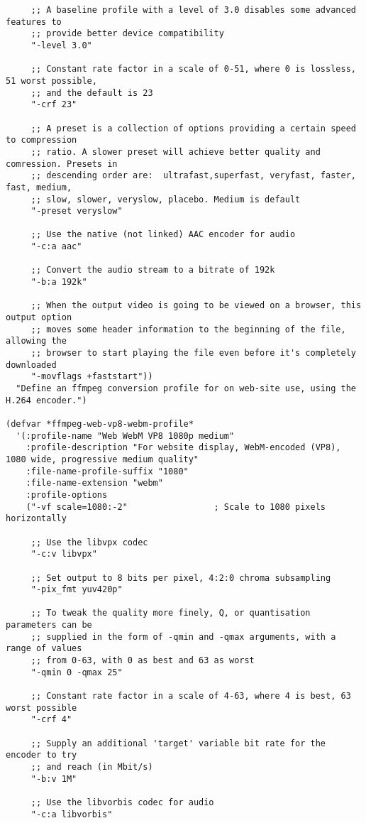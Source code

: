 \documentclass{article}
\begin{document}
\begin{verbatim}
     ;; A baseline profile with a level of 3.0 disables some advanced features to
     ;; provide better device compatibility
     "-level 3.0"

     ;; Constant rate factor in a scale of 0-51, where 0 is lossless, 51 worst possible,
     ;; and the default is 23
     "-crf 23"

     ;; A preset is a collection of options providing a certain speed to compression
     ;; ratio. A slower preset will achieve better quality and comression. Presets in
     ;; descending order are:  ultrafast,superfast, veryfast, faster, fast, medium,
     ;; slow, slower, veryslow, placebo. Medium is default
     "-preset veryslow"

     ;; Use the native (not linked) AAC encoder for audio
     "-c:a aac"

     ;; Convert the audio stream to a bitrate of 192k
     "-b:a 192k"

     ;; When the output video is going to be viewed on a browser, this output option
     ;; moves some header information to the beginning of the file, allowing the
     ;; browser to start playing the file even before it's completely downloaded
     "-movflags +faststart"))
  "Define an ffmpeg conversion profile for on web-site use, using the H.264 encoder.")

(defvar *ffmpeg-web-vp8-webm-profile*
  '(:profile-name "Web WebM VP8 1080p medium"
    :profile-description "For website display, WebM-encoded (VP8), 1080 wide, progressive medium quality"
    :file-name-profile-suffix "1080"
    :file-name-extension "webm"
    :profile-options
    ("-vf scale=1080:-2"                 ; Scale to 1080 pixels horizontally

     ;; Use the libvpx codec
     "-c:v libvpx"
     
     ;; Set output to 8 bits per pixel, 4:2:0 chroma subsampling
     "-pix_fmt yuv420p"                  

     ;; To tweak the quality more finely, Q, or quantisation parameters can be
     ;; supplied in the form of -qmin and -qmax arguments, with a range of values
     ;; from 0-63, with 0 as best and 63 as worst
     "-qmin 0 -qmax 25"

     ;; Constant rate factor in a scale of 4-63, where 4 is best, 63 worst possible
     "-crf 4"

     ;; Supply an additional 'target' variable bit rate for the encoder to try
     ;; and reach (in Mbit/s)
     "-b:v 1M"

     ;; Use the libvorbis codec for audio
     "-c:a libvorbis"


\end{verbatim}
\end{document}
